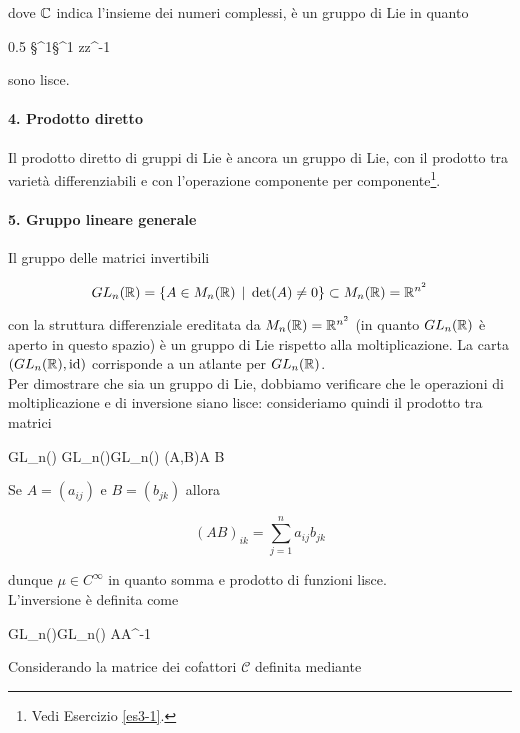 dove $ \mathbb{C} $ indica l'insieme dei numeri complessi, è un gruppo di Lie in quanto

	{0.5}{%
				{\S^{1}}{\S^{1}}
				{z}{z^{-1}}
			}

sono lisce.

\paragraph{4. Prodotto diretto}

Il prodotto diretto di gruppi di Lie è ancora un gruppo di Lie, con il prodotto tra varietà differenziabili e con l'operazione componente per componente\footnote{%
	Vedi Esercizio \ref{es3-1}.%
}.

\paragraph{5. Gruppo lineare generale}

Il gruppo delle matrici invertibili

\begin{equation}
	GL_{n}(\mathbb{R}) = \{ A \in M_{n}(\mathbb{R}) \, \mid \, \det(A) \neq 0 \} \subset M_{n}(\mathbb{R}) = \mathbb{R}^{n^{2}}
\end{equation}

con la struttura differenziale ereditata da $ M_{n}(\mathbb{R}) = \mathbb{R}^{n^{2}} $ (in quanto $ GL_{n}(\mathbb{R}) $ è aperto in questo spazio) è un gruppo di Lie rispetto alla moltiplicazione. La carta $ (GL_{n}(\mathbb{R}),\operatorname{id}) $ corrisponde a un atlante per $ GL_{n}(\mathbb{R}) $.\\
Per dimostrare che sia un gruppo di Lie, dobbiamo verificare che le operazioni di moltiplicazione e di inversione siano lisce: consideriamo quindi il prodotto tra matrici

\map{\mu}
	{GL_{n}(\R) \times GL_{n}(\R)}{GL_{n}(\R)}
	{(A,B)}{A B}

Se $ A = (a_{ij}) $ e $ B = (b_{jk}) $ allora

\begin{equation}
	(A B)_{ik} = \sum_{j=1}^{n} a_{ij} b_{jk}
\end{equation}

dunque $ \mu \in C^{\infty} $ in quanto somma e prodotto di funzioni lisce.\\
L'inversione è definita come

	{GL_{n}(\R)}{GL_{n}(\R)}
	{A}{A^{-1}}

Considerando la matrice dei cofattori $ \mathcal{C} $ definita mediante

